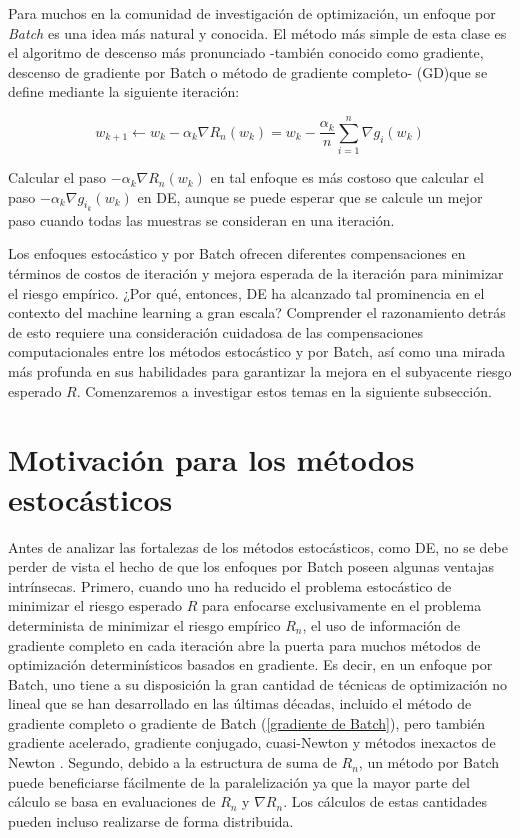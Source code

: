 	Para muchos en la comunidad de investigaci\'on de optimizaci\'on, un enfoque por \textit{Batch} es una idea m\'as natural y conocida. El m\'etodo m\'as simple de esta clase es el algoritmo de descenso m\'as pronunciado -tambi\'en conocido como gradiente, descenso de gradiente por Batch o m\'etodo de gradiente completo- (GD)que se define mediante la siguiente iteraci\'on:
	
	\begin{equation}
	\label{gradiente de Batch}
	w_{k+1} \gets w_k - \alpha_k \nabla R_n(w_k) = w_k -\frac{\alpha_k}{n} \sum\limits_{i=1}^{n} {\nabla g_i (w_k)}
	\end{equation}
	
	Calcular el paso $- \alpha_k \nabla R_n (w_k)$ en tal enfoque es m\'as costoso que calcular el paso $- \alpha_k \nabla g_{i_k} (w_k)$ en DE, aunque se puede esperar que se calcule un mejor paso cuando todas las muestras se consideran en una iteraci\'on.
	
	Los enfoques estoc\'astico y por Batch ofrecen diferentes compensaciones en t\'erminos de costos de iteraci\'on y mejora esperada de la iteraci\'on para minimizar el riesgo emp\'irico. ¿Por qu\'e, entonces, DE ha alcanzado tal prominencia en el contexto del machine learning a gran escala? Comprender el razonamiento detr\'as de esto requiere una consideraci\'on cuidadosa de las compensaciones computacionales entre los m\'etodos estoc\'astico y por Batch, as\'i como una mirada m\'as profunda en sus habilidades para garantizar la mejora en el subyacente riesgo esperado $R$. Comenzaremos a investigar estos temas en la siguiente subsecci\'on.
	
	\section{Motivaci\'on para los m\'etodos estoc\'asticos}
	Antes de analizar las fortalezas de los m\'etodos estoc\'asticos, como DE, no se debe perder de vista el hecho de que los enfoques por Batch poseen algunas ventajas intr\'insecas. Primero, cuando uno ha reducido el problema estoc\'astico de minimizar el riesgo esperado $R$ para enfocarse exclusivamente en el problema determinista de minimizar el riesgo emp\'irico $R_n$, el uso de informaci\'on de gradiente completo en cada iteraci\'on abre la puerta para muchos m\'etodos de optimizaci\'on determin\'isticos basados en gradiente. Es decir, en un enfoque por Batch, uno tiene a su disposici\'on la gran cantidad de t\'ecnicas de optimizaci\'on no lineal que se han desarrollado en las \'ultimas d\'ecadas, incluido el m\'etodo de gradiente completo o gradiente de Batch (\ref{gradiente de Batch}), pero tambi\'en gradiente acelerado, gradiente conjugado, cuasi-Newton y m\'etodos inexactos de Newton \cite{nocedal:2006}. Segundo, debido a la estructura de suma de $R_n$, un m\'etodo por Batch puede beneficiarse f\'acilmente de la paralelizaci\'on ya que la mayor parte del c\'alculo se basa en evaluaciones de $R_n$ y $\nabla R_n$. Los c\'alculos de estas cantidades pueden incluso realizarse de forma distribuida.
	
